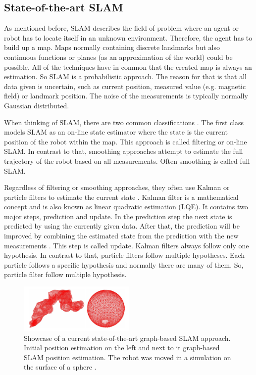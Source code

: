 \subsection{State-of-the-art SLAM}
\label{chap:slam}
As mentioned before, SLAM describes the field of problem where an agent or robot has to locate itself
in an unknown environment. Therefore, the agent has to build up a map. Maps normally containing discrete 
landmarks but also continuous functions or planes (as an approximation of the world) could be possible. 
All of the techniques have in common that the created map is always an estimation. So SLAM is a 
probabilistic approach. The reason for that is that all data given is uncertain, such as current 
position, measured value (e.g. magnetic field) or landmark position. The noise of the measurements is 
typically normally Gaussian distributed. 

When thinking of SLAM, there are two common classifications \cite{grisetti_tutorial_2010}. The first 
class models SLAM as an on-line state estimator where the state is the current position of the robot 
within the map. This approach is called filtering or on-line SLAM. In contrast to that, smoothing 
approaches attempt to estimate the full trajectory of the robot based on all measurements. 
Often smoothing is called full SLAM.

Regardless of filtering or smoothing approaches, they often use Kalman or particle filters to estimate
the current state \cite{grisetti_tutorial_2010}. Kalman filter is a mathematical concept and is also known
as linear quadratic estimation (LQE). It contains two major steps, prediction and update.
In the prediction step the next state is predicted by using the currently given data. After that, 
the prediction will be improved by combining the estimated state from the prediction with the new measurements 
\cite{kalman_filter_2001}. This step is called update. Kalman filters always follow only one
hypothesis. In contrast to that, particle filters follow multiple hypotheses. Each particle follows a specific
hypothesis and normally there are many of them. So, particle filter follow multiple hypothesis.

\begin{figure}[h!]
	\centering
	\includegraphics[width=0.5\textwidth]{images/grisetti_slam_showcase.png}
	\caption{
        Showcase of a current state-of-the-art graph-based SLAM approach.
        Initial position estimation on the left and next to it graph-based 
        SLAM position estimation. The robot was moved in a simulation on 
        the surface of a sphere \cite{grisetti_tutorial_2010}.
        }
	\label{fig:grisetti_slam_showcase}
\end{figure}

